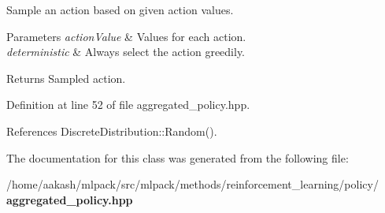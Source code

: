 Sample an action based on given action values. 


\begin{DoxyParams}{Parameters}
{\em action\+Value} & Values for each action. \\
\hline
{\em deterministic} & Always select the action greedily. \\
\hline
\end{DoxyParams}
\begin{DoxyReturn}{Returns}
Sampled action. 
\end{DoxyReturn}


Definition at line 52 of file aggregated\+\_\+policy.\+hpp.



References Discrete\+Distribution\+::\+Random().



The documentation for this class was generated from the following file\+:\begin{DoxyCompactItemize}
\item 
/home/aakash/mlpack/src/mlpack/methods/reinforcement\+\_\+learning/policy/\textbf{ aggregated\+\_\+policy.\+hpp}\end{DoxyCompactItemize}
